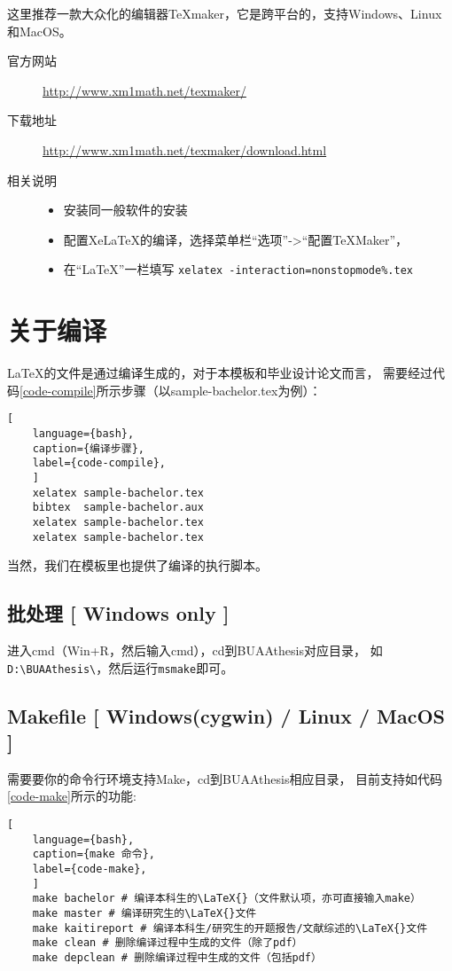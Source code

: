 这里推荐一款大众化的编辑器\TeX{}maker，它是跨平台的，支持Windows、Linux和MacOS。

\begin{description}
	\item[官方网站]
	\url{http://www.xm1math.net/texmaker/}
	\item[下载地址]
	\url{http://www.xm1math.net/texmaker/download.html}
	\item[相关说明]
	\begin{itemize}
		\item 安装同一般软件的安装
		\item 配置Xe\LaTeX{}的编译，选择菜单栏“选项”->“配置\TeX{}Maker”，
		\item[] 在“\LaTeX{}”一栏填写
		\texttt{xelatex -interaction=nonstopmode\%.tex}
	\end{itemize}
\end{description}

\section{关于编译}

\LaTeX{}的文件是通过编译生成的，对于本模板和毕业设计论文而言，
需要经过代码\ref{code-compile}所示步骤（以sample-bachelor.tex为例）：
\begin{lstlisting}[
	language={bash},
	caption={编译步骤},
	label={code-compile},
	]
	xelatex sample-bachelor.tex
	bibtex  sample-bachelor.aux
	xelatex sample-bachelor.tex
	xelatex sample-bachelor.tex
\end{lstlisting}
当然，我们在模板里也提供了编译的执行脚本。

\subsection{批处理 [ Windows only ]}

进入cmd（Win+R，然后输入cmd），cd到BUAAthesis对应目录，
如\verb|D:\BUAAthesis\|，然后运行\verb|msmake|即可。

\subsection{Makefile [ Windows(cygwin) / Linux / MacOS ]}
需要要你的命令行环境支持Make，cd到BUAAthesis相应目录，
目前支持如代码\ref{code-make}所示的功能:
\begin{lstlisting}[
	language={bash},
	caption={make 命令},
	label={code-make},
	]
	make bachelor # 编译本科生的\LaTeX{}（文件默认项，亦可直接输入make）
	make master # 编译研究生的\LaTeX{}文件
	make kaitireport # 编译本科生/研究生的开题报告/文献综述的\LaTeX{}文件
	make clean # 删除编译过程中生成的文件（除了pdf）
	make depclean # 删除编译过程中生成的文件（包括pdf）
\end{lstlisting}

